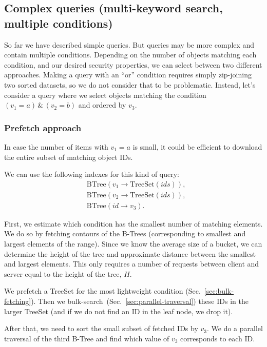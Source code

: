 \documentclass[notitlepage,longbibliography]{revtex4-1}
\begin{document}
\subsection{Complex queries (multi-keyword search, multiple conditions)}

So far we have described simple queries.
But queries may be more complex and contain multiple conditions.
Depending on the number of objects matching each condition, and our desired security properties, we can select between two different approaches.
Making a query with an ``or'' condition requires simply zip-joining two sorted datasets, so we do not consider that to be problematic.
Instead, let's consider a query where we select objects matching the condition $(v_1 = a) \,\&\, (v_2 = b)$ and ordered by $v_3$.

\subsubsection{Prefetch approach}
\label{sec:prefetch}

In case the number of items with $v_1=a$ is small, it could be efficient to download the entire subset of matching object IDs.

We can use the following indexes for this kind of query:
\begin{align*}
    & \mbox{BTree}(v_1 \rightarrow \mbox{TreeSet}(ids)),\\
    & \mbox{BTree}(v_2 \rightarrow \mbox{TreeSet}(ids)),\\
    & \mbox{BTree}(id \rightarrow v_3).
\end{align*}

First, we estimate which condition has the smallest number of matching elements.
We do so by fetching contours of the B-Trees (corresponding to smallest and largest elements of the range). Since we know the average size of a bucket, we can determine the height of the tree and approximate distance between the smallest and largest elements.
This only requires a number of requests between client and server equal to the height of the tree, $H$.

We prefetch a TreeSet for the most lightweight condition (Sec.~\ref{sec:bulk-fetching}).
Then we bulk-search~(Sec.~\ref{sec:parallel-traversal}) these IDs in the larger TreeSet (and if we do not find an ID in the leaf node, we drop it).

After that, we need to sort the small subset of fetched IDs by $v_3$.
We do a parallel traversal of the third B-Tree and find which value of $v_3$ corresponds to each ID.
\end{document}
